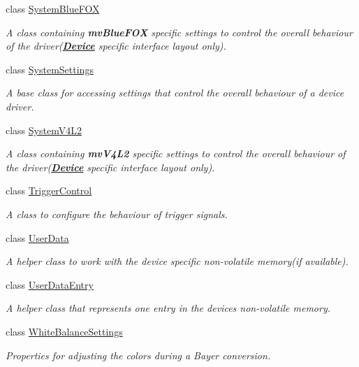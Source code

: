 \begin{DoxyCompactItemize}
class \hyperlink{classmv_i_m_p_a_c_t_1_1acquire_1_1_system_blue_f_o_x}{System\+Blue\+F\+O\+X}
\begin{DoxyCompactList}\small\item\em A class containing {\bfseries mv\+Blue\+F\+O\+X} specific settings to control the overall behaviour of the driver({\bfseries \hyperlink{classmv_i_m_p_a_c_t_1_1acquire_1_1_device}{Device}} specific interface layout only). \end{DoxyCompactList}\item 
class \hyperlink{classmv_i_m_p_a_c_t_1_1acquire_1_1_system_settings}{System\+Settings}
\begin{DoxyCompactList}\small\item\em A base class for accessing settings that control the overall behaviour of a device driver. \end{DoxyCompactList}\item 
class \hyperlink{classmv_i_m_p_a_c_t_1_1acquire_1_1_system_v4_l2}{System\+V4\+L2}
\begin{DoxyCompactList}\small\item\em A class containing {\bfseries mv\+V4\+L2} specific settings to control the overall behaviour of the driver({\bfseries \hyperlink{classmv_i_m_p_a_c_t_1_1acquire_1_1_device}{Device}} specific interface layout only). \end{DoxyCompactList}\item 
class \hyperlink{classmv_i_m_p_a_c_t_1_1acquire_1_1_trigger_control}{Trigger\+Control}
\begin{DoxyCompactList}\small\item\em A class to configure the behaviour of trigger signals. \end{DoxyCompactList}\item 
class \hyperlink{classmv_i_m_p_a_c_t_1_1acquire_1_1_user_data}{User\+Data}
\begin{DoxyCompactList}\small\item\em A helper class to work with the device specific non-\/volatile memory(if available). \end{DoxyCompactList}\item 
class \hyperlink{classmv_i_m_p_a_c_t_1_1acquire_1_1_user_data_entry}{User\+Data\+Entry}
\begin{DoxyCompactList}\small\item\em A helper class that represents one entry in the devices non-\/volatile memory. \end{DoxyCompactList}\item 
class \hyperlink{classmv_i_m_p_a_c_t_1_1acquire_1_1_white_balance_settings}{White\+Balance\+Settings}
\begin{DoxyCompactList}\small\item\em Properties for adjusting the colors during a Bayer conversion. \end{DoxyCompactList}\end{DoxyCompactItemize}
